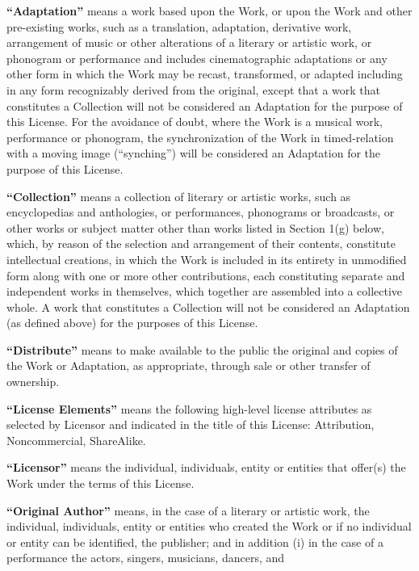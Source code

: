 \begin{doclicense@enumerate}
\item \textbf{``Adaptation''} means a work based upon
the Work, or upon the Work and other pre-existing works,
such as a translation, adaptation, derivative work,
arrangement of music or other alterations of a literary
or artistic work, or phonogram or performance and
includes cinematographic adaptations or any other form in
which the Work may be recast, transformed, or adapted
including in any form recognizably derived from the
original, except that a work that constitutes a
Collection will not be considered an Adaptation for the
purpose of this License. For the avoidance of doubt,
where the Work is a musical work, performance or
phonogram, the synchronization of the Work in
timed-relation with a moving image (``synching'') will be
considered an Adaptation for the purpose of this
License.
\item \textbf{``Collection''} means a collection of
literary or artistic works, such as encyclopedias and
anthologies, or performances, phonograms or broadcasts,
or other works or subject matter other than works listed
in Section 1(g) below, which, by reason of the selection
and arrangement of their contents, constitute
intellectual creations, in which the Work is included in
its entirety in unmodified form along with one or more
other contributions, each constituting separate and
independent works in themselves, which together are
assembled into a collective whole. A work that
constitutes a Collection will not be considered an
Adaptation (as defined above) for the purposes of this
License.
\item \textbf{``Distribute''} means to make available
to the public the original and copies of the Work or
Adaptation, as appropriate, through sale or other
transfer of ownership.
\item \textbf{``License Elements''} means the
following high-level license attributes as selected by
Licensor and indicated in the title of this License:
Attribution, Noncommercial, ShareAlike.
\item \textbf{``Licensor''} means the individual,
individuals, entity or entities that offer(s) the Work
under the terms of this License.
\item \textbf{``Original Author''} means, in the case
of a literary or artistic work, the individual,
individuals, entity or entities who created the Work or
if no individual or entity can be identified, the
publisher; and in addition (i) in the case of a
performance the actors, singers, musicians, dancers, and

\end{doclicense@enumerate}
